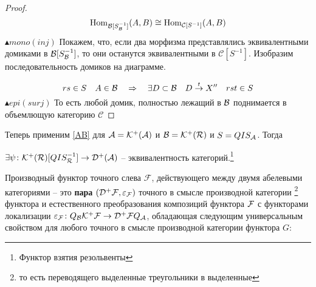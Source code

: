 \documentclass[../main.tex]{subfiles}
\begin{document}
\begin{proof}
    \[\operatorname{Hom}_{\mathcal{B}[S_{\mathcal{B}}^{-1}]} (A, B) \cong \operatorname{Hom}_{\mathcal{C}[S^{-1}]}(A, B) \]
    $\blacktriangle mono(inj)$ Покажем, что, если два морфизма представлялись эквивалентными домиками в $\mathcal{B}[S_{\mathcal{B}}^{-1}]$, то они останутся эквивалентными в $\mathcal{C}[S^{-1}]$. Изобразим последовательность домиков на диаграмме.
    \bee
    \eee
    \[rs \in S \quad A \in \mathcal{B} \quad \Rightarrow \quad \exists D \subset \mathcal{B} \quad D \overset{t}{\to}X'' \quad rst \in S \]
    $\blacktriangle epi(surj)$ То есть любой домик, полностью лежащий в $\mathcal{B}$ поднимается в объемлющую категорию $\mathcal{C}$
    \bee
    \eee
\end{proof}
Теперь применим \ref{AB} для $\mathcal{A} = \mathcal{K^+(\mathcal{A})}$ и $\mathcal{B} = \mathcal{K^+(\mathcal{R})}$ и $S = QIS_{\mathcal{A}}$. Тогда 
\begin{to_claim}
$\exists \psi\colon \mathcal{K^+(\mathcal{R})}[QIS_{\mathcal{R}}^{-1}]\to \mathcal{D^+(\mathcal{A})}$ -- эквивалентность категорий.\footnote{Функтор взятия резольвенты}
\end{to_claim}
\newpage
\begin{to_def}
\label{derived_functor}
Производный функтор точного слева $\mathcal{F}$, действующего между двумя абелевыми категориями -- это \textbf{пара} $(\mathcal{D^+ F}, \varepsilon_{\mathcal{F}})$ точного в смысле производной категории \footnote{то есть переводящего выделенные треугольники в выделенные} функтора и естественного преобразования композиций функтора $\mathcal{F}$ с функторами локализации $\varepsilon_{\mathcal{F}}\colon Q_{\mathcal{B}}\mathcal{K^+ F} \to \mathcal{D^+ F} Q_{\mathcal{A}}$, обладающая следующим универсальным свойством для любого точного в смысле производной категории функтора $G$:
\bee
{}
\eee
\bee
{}
\eee
\end{to_def}
\end{document}
